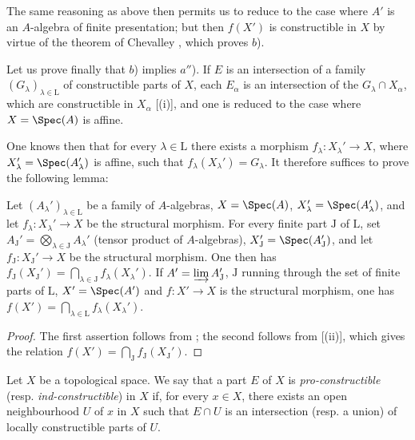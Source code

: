The same reasoning as above then permits us to reduce to the case where $A'$ is an $A$-algebra of finite presentation; but then $f(X')$ is constructible in $X$ by virtue of the theorem of Chevalley , which proves $b$).

Let us prove finally that $b$) implies $a''$).
If $E$ is an intersection of a family $(G_\lambda)_{\lambda\in\mathrm{L}}$ of constructible parts of $X$, each $E_\alpha$ is an intersection of the $G_\lambda\cap X_\alpha$, which are constructible in $X_\alpha$ [(i)], and one is reduced to the case where $X=\Spec(A)$ is affine.

One knows then  that for every $\lambda\in\mathrm{L}$ there exists a morphism $f_\lambda:X_\lambda'\to X$, where $X_\lambda'=\Spec(A_\lambda')$ is affine, such that $f_\lambda(X_\lambda')=G_\lambda$.
It therefore suffices to prove the following lemma:

\begin{lemma}[1.9.3.2]
\label{IV.1.9.3.2}
Let $(A_\lambda')_{\lambda\in\mathrm{L}}$ be a family of $A$-algebras, $X=\Spec(A)$, $X_\lambda'=\Spec(A_\lambda')$, and let $f_\lambda:X_\lambda'\to X$ be the structural morphism.
For every finite part $\mathrm{J}$ of $\mathrm{L}$, set $A_\mathrm{J}'=\bigotimes_{\lambda\in\mathrm{J}} A_\lambda'$ (tensor product of $A$-algebras), $X_\mathrm{J}'=\Spec(A_\mathrm{J}')$, and let $f_\mathrm{J}:X_\mathrm{J}'\to X$ be the structural morphism.
One then has $f_\mathrm{J}(X_\mathrm{J}')=\bigcap_{\lambda\in\mathrm{J}} f_\lambda(X_\lambda')$.
If $A'=\varinjlim A_\mathrm{J}'$, $\mathrm{J}$ running through the set of finite parts of $\mathrm{L}$, $X'=\Spec(A')$ and $f:X'\to X$ is the structural morphism, one has $f(X')=\bigcap_{\lambda\in\mathrm{L}} f_\lambda(X_\lambda')$.
\end{lemma}

\begin{proof}
The first assertion follows from ; the second follows from [(ii)], which gives the relation $f(X')=\bigcap_\mathrm{J} f_\mathrm{J}(X_\mathrm{J}')$.
\end{proof}

\begin{definition}[1.9.4]
\label{IV.1.9.4}
Let $X$ be a topological space.
We say that a part $E$ of $X$ is \emph{pro-constructible} (resp. \emph{ind-constructible}) in $X$ if, for every $x\in X$, there exists an open neighbourhood $U$ of $x$ in $X$ such that $E\cap U$ is an intersection (resp. a union) of locally constructible parts of $U$.
\end{definition}

